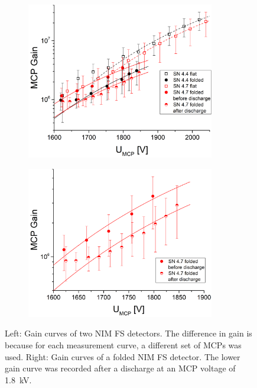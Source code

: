 	\begin{figure}[H] %
		\begin{subfigure}{.5\textwidth}
			\centering
			\includegraphics[width=0.9\textwidth]{Experiments/Gain_Curves_SN4p5_4p7.png}
		\end{subfigure}
		\begin{subfigure}{.5\textwidth}
			\centering
			\includegraphics[width=0.9\textwidth]{Experiments/SN4p7_discharge.png}
		\end{subfigure}
		\caption{Left: Gain curves of two NIM FS detectors. The difference in gain is because for each measurement curve, a different set of MCPs was used. Right: Gain curves of a folded NIM FS detector. The lower gain curve was recorded after a discharge at an MCP voltage of 1.8~kV.}
		\label{fig:SN4p54p7Gain}
	\end{figure}
